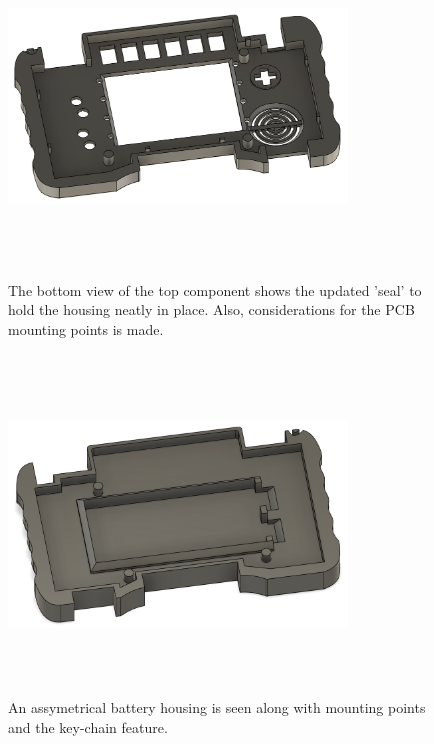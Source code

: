 \begin{figure} [h]
    \centering
    \includegraphics[width=9cm,height=9cm,keepaspectratio]{Figures/iteration2_top_back.png}
    \caption{The bottom view of the top component shows the updated 'seal' to hold the housing neatly in place. Also, considerations for the PCB mounting points is made.}
    \label{fig:iteration2_t_b}
\end{figure}

\begin{figure} [h]
    \centering
    \includegraphics[width=9cm,height=9cm,keepaspectratio]{Figures/iteration2_bottom_front.png}
    \caption{An assymetrical battery housing is seen along with mounting points and the key-chain feature.}
    \label{fig:iteration2_b_f}
\end{figure}


